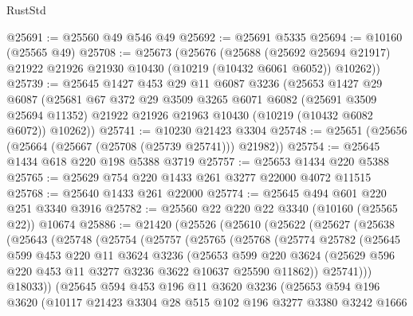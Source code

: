 \begin{lexlean}{RustStd}
\begin{coremodule}
@25691 := @25560 @49 @546 @49
@25692 := @25691 @5335
@25694 := @10160 (@25565 @49)
@25708 := @25673
    (@25676
      (@25688
        (@25692 @25694 @21917)
        @21922
        @21926
        @21930
        @10430
        (@10219 (@10432 @6061 @6052))
        @10262))
@25739 := @25645
    @1427
    @453
    @29
    @11
    @6087
    @3236
    (@25653
      @1427
      @29
      @6087
      (@25681
        @67
        @372
        @29
        @3509
        @3265
        @6071
        @6082
        (@25691 @3509 @25694 @11352)
        @21922
        @21926
        @21963
        @10430
        (@10219 (@10432 @6082 @6072))
        @10262))
@25741 := @10230 @21423 @3304
@25748 := @25651 (@25656 (@25664 (@25667 (@25708 (@25739 @25741))) @21982))
@25754 := @25645 @1434 @618 @220 @198 @5388 @3719
@25757 := @25653 @1434 @220 @5388
@25765 := @25629 @754 @220 @1433 @261 @3277 @22000 @4072 @11515
@25768 := @25640 @1433 @261 @22000
@25774 := @25645 @494 @601 @220 @251 @3340 @3916
@25782 := @25560 @22 @220 @22 @3340 (@10160 (@25565 @22)) @10674
@25886 := @21420
    (@25526
      (@25610
        (@25622
          (@25627
            (@25638
              (@25643
                (@25748
                  (@25754
                    (@25757
                      (@25765
                        (@25768
                          (@25774
                            @25782
                            (@25645
                              @599
                              @453
                              @220
                              @11
                              @3624
                              @3236
                              (@25653
                                @599
                                @220
                                @3624
                                (@25629 @596 @220 @453 @11 @3277 @3236 @3622 @10637 @25590 @11862))
                              @25741)))
                        @18033))
                    (@25645
                      @594
                      @453
                      @196
                      @11
                      @3620
                      @3236
                      (@25653
                        @594
                        @196
                        @3620
                        (@10117
                          @21423
                          @3304
                          @28
                          @515
                          @102
                          @196
                          @3277
                          @3380
                          @3242
                          @1666

\end{coremodule}
\end{lexlean}
